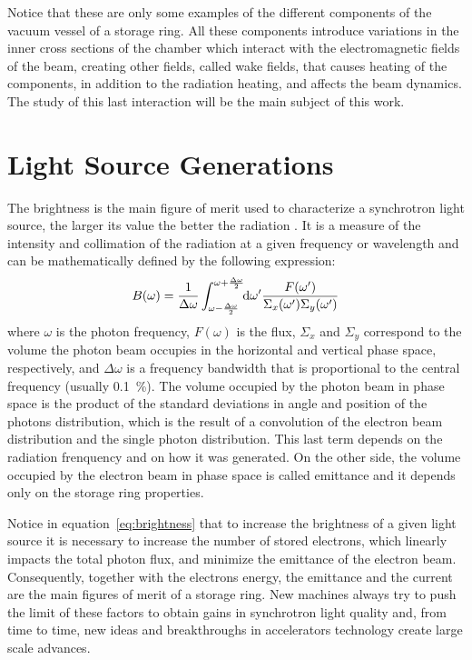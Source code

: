     Notice that these are only some examples of the different components of the vacuum vessel of a storage ring. All these components introduce variations in the inner cross sections of the chamber which interact with the electromagnetic fields of the beam, creating other fields, called wake fields, that causes heating of the components, in addition to the radiation heating, and affects the beam dynamics. The study of this last interaction will be the main subject of this work.

\section{Light Source Generations}

    The brightness is the main figure of merit used to characterize a synchrotron light source, the larger its value the better the radiation . It is a measure of the intensity and collimation of the radiation at a given frequency or wavelength and can be mathematically defined by the following expression:
    \begin{align}\label{eq:brightness}
        B(\omega) = \frac{1}{\Delta\omega}\defint{\omega'}{\frac{F(\omega')}{\Sigma_x(\omega')\Sigma_y(\omega')}}{\omega-\frac{\Delta\omega}{2}}{\omega+\frac{\Delta\omega}{2}}
    \end{align}
    where $\omega$ is the photon frequency, $F(\omega)$ is the flux, $\Sigma_x$ and $\Sigma_y$ correspond to the volume the photon beam occupies in the horizontal and vertical phase space, respectively, and $\Delta\omega$ is a frequency bandwidth that is proportional to the central frequency (usually \SI{0.1}{\percent}). The volume occupied by the photon beam in phase space is the product of the standard deviations in angle and position of the photons distribution, which is the result of a convolution of the electron beam distribution and the single photon distribution. This last term depends on the radiation frenquency and on how it was generated. On the other side, the volume occupied by the electron beam in phase space is called emittance and it depends only on the storage ring properties.

    Notice in equation~\eqref{eq:brightness} that to increase the brightness of a given light source it is necessary to increase the number of stored electrons, which linearly impacts the total photon flux, and minimize the emittance of the electron beam. Consequently, together with the electrons energy, the emittance and the current are the main figures of merit of a storage ring. New machines always try to push the limit of these factors to obtain gains in synchrotron light quality and, from time to time, new ideas and breakthroughs in accelerators technology create large scale advances.

